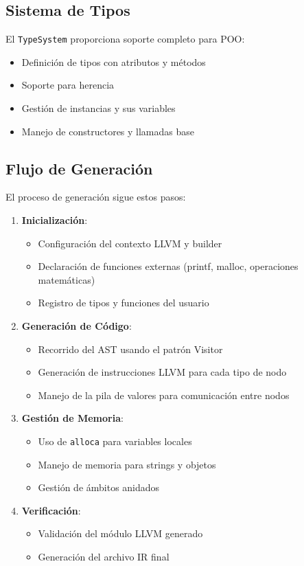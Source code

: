 \documentclass[11pt, a4paper, twoside]{article} %
\begin{document}
\subsection{Sistema de Tipos}

El \texttt{TypeSystem} proporciona soporte completo para POO:

\begin{itemize}
    \item Definición de tipos con atributos y métodos
    \item Soporte para herencia
    \item Gestión de instancias y sus variables
    \item Manejo de constructores y llamadas base
\end{itemize}

\subsection{Flujo de Generación}

El proceso de generación sigue estos pasos:

\begin{enumerate}
    \item \textbf{Inicialización}:
    \begin{itemize}
        \item Configuración del contexto LLVM y builder
        \item Declaración de funciones externas (printf, malloc, operaciones matemáticas)
        \item Registro de tipos y funciones del usuario
    \end{itemize}
    
    \item \textbf{Generación de Código}:
    \begin{itemize}
        \item Recorrido del AST usando el patrón Visitor
        \item Generación de instrucciones LLVM para cada tipo de nodo
        \item Manejo de la pila de valores para comunicación entre nodos
    \end{itemize}
    
    \item \textbf{Gestión de Memoria}:
    \begin{itemize}
        \item Uso de \texttt{alloca} para variables locales
        \item Manejo de memoria para strings y objetos
        \item Gestión de ámbitos anidados
    \end{itemize}
    
    \item \textbf{Verificación}:
    \begin{itemize}
        \item Validación del módulo LLVM generado
        \item Generación del archivo IR final
    \end{itemize}
\end{enumerate}
\end{document}

